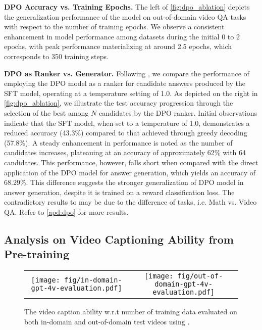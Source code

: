 \textbf{DPO Accuracy vs. Training Epochs.} The left of \cref{fig:dpo_ablation} depicts the generalization performance of the model on out-of-domain video QA tasks with respect to the number of training epochs. We observe a consistent enhancement in model performance among datasets during the initial 0 to 2 epochs, with peak performance materializing at around 2.5 epochs, which corresponds to 350 training steps.

\textbf{DPO as Ranker vs. Generator.}
Following \cite{hosseini2024v}, we compare the performance of employing the DPO model as a ranker for candidate answers produced by the SFT model, operating at a temperature setting of 1.0. As depicted on the right in \cref{fig:dpo_ablation}, we illustrate the test accuracy progression through the selection of the best among $N$ candidates by the DPO ranker. Initial observations indicate that the SFT model, when set to a temperature of 1.0, demonstrates a reduced accuracy (43.3\%) compared to that achieved through greedy decoding (57.8\%). A steady enhancement in performance is noted as the number of candidates increases, plateauing at an accuracy of approximately 62\% with 64 candidates. This performance, however, falls short when compared with the direct application of the DPO model for answer generation, which yields an accuracy of 68.29\%. This difference suggests the stronger generalization of DPO model in answer generation, despite it is trained on a reward classification loss. The contradictory results to \cite{hosseini2024v} may be due to the difference of tasks, i.e. Math vs. Video QA.
Refer to \cref{apd:dpo} for more results.

\subsection{Analysis on Video Captioning Ability from Pre-training}
\vspace{-0.4cm}
\begin{figure}[ht]
\centering
\begin{tabular}{@{}cc@{}}
\texttt{[image: fig/in-domain-gpt-4v-evaluation.pdf]} & 
\texttt{[image: fig/out-of-domain-gpt-4v-evaluation.pdf]} \\
\end{tabular}
\caption{The video caption ability w.r.t number of training data evaluated on both in-domain and out-of-domain test videos using \gptv. %
}
\label{fig:overall_caption_trend}
\end{figure}

